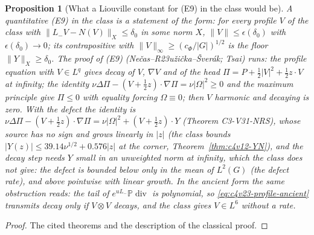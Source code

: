 \documentclass[11pt]{article}
\newcommand{\PP}{\mathbb P}
\theoremstyle{plain}
\newtheorem{proposition}[theorem]{Proposition}
\theoremstyle{definition}
\theoremstyle{remark}
\begin{document}
\begin{proposition}[What a Liouville constant for (E9) in the class would be]
\label{prop:c4v23-liouville}
A quantitative (E9) in the class is a statement of the form: for every
profile \(V\) of the class with \(\|L_-V-N(V)\|_X\le\delta_0\) in some norm \(X\),
\(\|V\|\le\epsilon(\delta_0)\) with \(\epsilon(\delta_0)\to0\); its contrapositive with \(\|V\|_\infty\ge(c_\Phi/|G|)^{1/2}\) is
the floor \(\|Y\|_X\ge\delta_0\).  The proof of (E9) (Ne\v cas--R\accent23u\v zi\v cka--\v Sver\'ak; Tsai)
runs: the profile equation with \(V\in L^q\) gives decay of \(V\), \(\nabla V\) and
of the head \(\Pi=P+\frac12|V|^2+\frac12z\cdot V\) at infinity; the identity
\(\nu\Delta\Pi-(V+\frac12z)\cdot\nabla\Pi=\nu|\Omega|^2\ge0\) and the maximum principle give \(\Pi\le0\)
with equality forcing \(\Omega\equiv0\); then \(V\) harmonic and decaying is zero.
With the defect the identity is \(\nu\Delta\Pi-(V+\frac12z)\cdot\nabla\Pi=\nu|\Omega|^2+(V+\frac12z)\cdot Y\)
(Theorem C3-V31-NRS), whose source has no sign and grows linearly
in \(|z|\) (the class bounds \(|Y(z)|\le39.14\nu^{1/2}+0.576|z|\) at the corner,
Theorem~\ref{thm:c4v12-YN}), and the decay step needs \(Y\) small in an
unweighted norm at infinity, which the class does not give: the
defect is bounded below only in the mean of \(L^2(G)\) (the defect
rate), and above pointwise with linear growth.  In the ancient form
the same obstruction reads: the tail of \(e^{uL_-}\PP\operatorname{div}\) is polynomial,
so \eqref{eq:c4v23-profile-ancient} transmits decay only if \(V\otimes V\)
decays, and the class gives \(V\in L^6\) without a rate.
\end{proposition}

\begin{proof}
The cited theorems and the description of the classical proof.
\end{proof}
\end{document}
